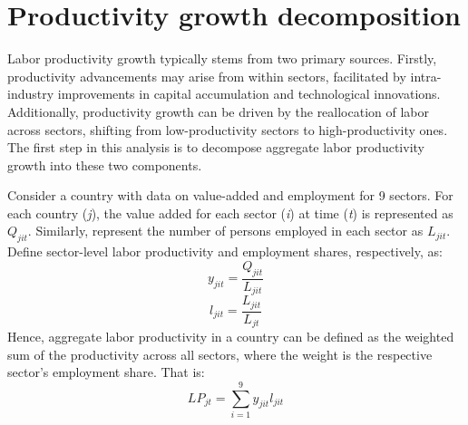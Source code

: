 \section{Productivity growth decomposition}
\label{sec2}
Labor productivity growth typically stems from two primary sources. Firstly, productivity advancements may arise from within sectors, facilitated by intra-industry improvements in capital accumulation and technological innovations. Additionally, productivity growth can be driven by the reallocation of labor across sectors, shifting from low-productivity sectors to high-productivity ones. The first step in this analysis is to decompose aggregate labor productivity growth into these two components.

Consider a country with data on value-added and employment for 9 sectors. For each country (\textit{j}), the value added for each sector (\textit{i}) at time (\textit{t}) is represented as $Q_{jit}$. Similarly, represent the number of persons employed in each sector as $L_{jit}$. Define sector-level labor productivity and employment shares, respectively, as:
$$
y_{jit}=\frac{Q_{jit}}{L_{jit}}
$$
 $$
 l_{jit}= \frac{L_{jit}}{L_{jt}}
 $$      
Hence, aggregate labor productivity in a country can be defined as the weighted sum of the productivity across all sectors, where the weight is the respective sector's employment share. That is:
\begin{equation}
    LP_{jt} = \sum_{i=1}^{9} y_{jit} l_{jit}
    \label{prod}
\end{equation}

